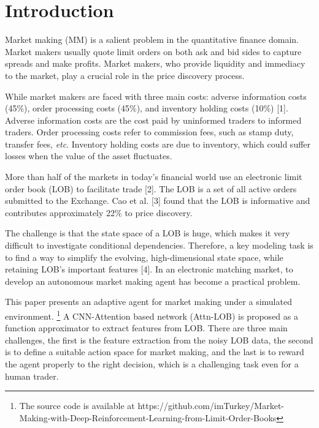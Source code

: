 \documentclass[conference]{IEEEtran}
\begin{document}
\section{Introduction}
Market making (MM) is a salient problem in the quantitative finance domain. Market makers usually quote limit orders on both ask and bid sides to capture spreads and make profits. Market makers, who provide liquidity and immediacy to the market, play a crucial role in the price discovery process.

While market makers are faced with three main costs: adverse information costs (45\%), order processing costs (45\%), and inventory holding costs (10\%) [1]. Adverse information costs are the cost paid by uninformed traders to informed traders. Order processing costs refer to commission fees, such as stamp duty, transfer fees, \textit{etc}. Inventory holding costs are due to inventory, which could suffer losses when the value of the asset fluctuates.

More than half of the markets in today's financial world use an electronic limit order book (LOB) to facilitate trade [2]. The LOB is a set of all active orders submitted to the Exchange. Cao et al. [3] found that the LOB is informative and contributes approximately 22\% to price discovery.

The challenge is that the state space of a LOB is huge, which makes it very difficult to investigate conditional dependencies. Therefore, a key modeling task is to find a way to simplify the evolving, high-dimensional state space, while retaining LOB's important features [4]. In an electronic matching market, to develop an autonomous market making agent has become a practical problem.

This paper presents an adaptive agent for market making under a simulated environment. \footnote{The source code is available at https://github.com/imTurkey/Market-Making-with-Deep-Reinforcement-Learning-from-Limit-Order-Books} A CNN-Attention based network (Attn-LOB) is proposed as a function approximator to extract features from LOB. There are three main challenges, the first is the feature extraction from the noisy LOB data, the second is to define a suitable action space for market making, and the last is to reward the agent properly to the right decision, which is a challenging task even for a human trader.
\end{document}
